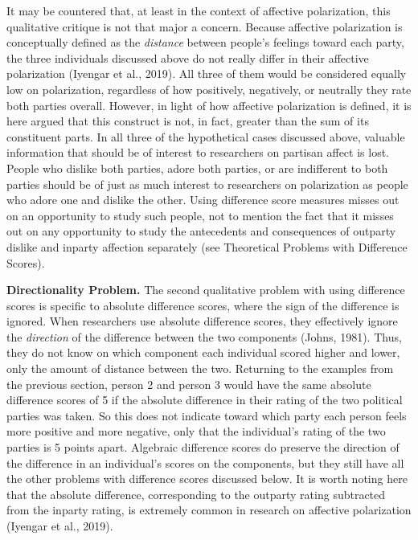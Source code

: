 \documentclass[authordate, meta, issue]{jote-new-article}
\begin{document}
	It may be countered that, at least in the context of affective polarization, this qualitative critique is not that major a concern. Because affective polarization is conceptually defined as the \emph{distance} between people's feelings toward each party, the three individuals discussed above do not really differ in their affective polarization (Iyengar et al., 2019). All three of them would be considered equally low on polarization, regardless of how positively, negatively, or neutrally they rate both parties overall. However, in light of how affective polarization is defined, it is here argued that this construct is not, in fact, greater than the sum of its constituent parts. In all three of the hypothetical cases discussed above, valuable information that should be of interest to researchers on partisan affect is lost. People who dislike both parties, adore both parties, or are indifferent to both parties should be of just as much interest to researchers on polarization as people who adore one and dislike the other. Using difference score measures misses out on an opportunity to study such people, not to mention the fact that it misses out on any opportunity to study the antecedents and consequences of outparty dislike and inparty affection separately (see Theoretical Problems with Difference Scores).



	\textbf{Directionality Problem. }The second qualitative problem with using difference scores is specific to absolute difference scores, where the sign of the difference is ignored. When researchers use absolute difference scores, they effectively ignore the \emph{direction }of the difference between the two components (Johns, 1981). Thus, they do not know on which component each individual scored higher and lower, only the amount of distance between the two. Returning to the examples from the previous section, person 2 and person 3 would have the same absolute difference scores of 5 if the absolute difference in their rating of the two political parties was taken. So this does not indicate toward which party each person feels more positive and more negative, only that the individual's rating of the two parties is 5 points apart. Algebraic difference scores do preserve the direction of the difference in an individual's scores on the components, but they still have all the other problems with difference scores discussed below. It is worth noting here that the absolute difference, corresponding to the outparty rating subtracted from the inparty rating, is extremely common in research on affective polarization (Iyengar et al., 2019).
\end{document}

